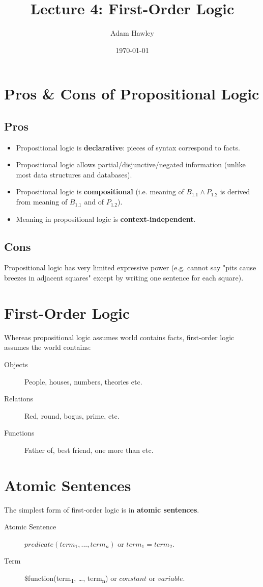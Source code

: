 \documentclass[11pt]{article}
\author{Adam Hawley}
\date{\today}
\title{Lecture 4: First-Order Logic}
\begin{document}
\maketitle
\tableofcontents


\section{Pros \& Cons of Propositional Logic}
\label{sec:org86d6434}
\subsection{Pros}
\label{sec:org748b300}
\begin{itemize}
\item Propositional logic is \textbf{declarative}: pieces of syntax correspond to facts.
\item Propositional logic allows partial/disjunctive/negated information (unlike most data structures and databases).
\item Propositional logic is \textbf{compositional} (i.e. meaning of \(B_{1.1}\land P_{1.2}\) is derived from meaning of \(B_{1.1}\) and of \(P_{1.2}\)).
\item Meaning in propositional logic is \textbf{context-independent}.
\end{itemize}

\subsection{Cons}
\label{sec:orgea65499}
Propositional logic has very limited expressive power (e.g. cannot say "pits cause breezes in adjacent squares" except by writing one sentence for each square).

\section{First-Order Logic}
\label{sec:orge97c7be}
Whereas propositional logic assumes world contains facts, first-order logic assumes the world contains:
\begin{description}
\item[{Objects}] People, houses, numbers, theories etc.
\item[{Relations}] Red, round, bogus, prime, etc.
\item[{Functions}] Father of, best friend, one more than etc.
\end{description}

\section{Atomic Sentences}
\label{sec:org408033b}
The simplest form of first-order logic is in \textbf{atomic sentences}.
\begin{description}
\item[{Atomic Sentence}] \(predicate(term_1, ..., term_n)\) or \(term_1=term_2\).
\item[{Term}] \$function(term\textsubscript{1}, \ldots{}, term\textsubscript{n}) or \(constant\) or \(variable\).
\end{description}
\end{document}
